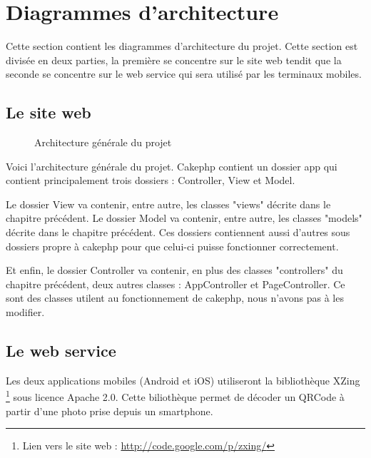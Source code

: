 \chapter{Diagrammes d'architecture}

Cette section contient les diagrammes d'architecture du projet. Cette section est divisée en deux parties, la première se concentre sur le site web tendit que la seconde se concentre sur le web service qui sera utilisé par les terminaux mobiles.
 
\newpage
\section{Le site web}

\begin{figure}[H]
	\begin{center}\end{center}
	\caption{Architecture générale du projet}
\end{figure}

Voici l'architecture générale du projet. Cakephp contient un dossier app qui contient principalement trois dossiers : Controller, View et Model. 

Le dossier View va contenir, entre autre, les classes "views" décrite dans le chapitre précédent. Le dossier Model va contenir, entre autre, les classes "models" décrite dans le chapitre précédent. Ces dossiers contiennent aussi d'autres sous dossiers propre à cakephp pour que celui-ci puisse fonctionner correctement.


Et enfin, le dossier Controller va contenir, en plus des classes "controllers" du chapitre précédent, deux autres classes : AppController et PageController. Ce sont des classes utilent au fonctionnement de cakephp, nous n'avons pas à les modifier.

\section{Le web service}
Les deux applications mobiles (Android et iOS) utiliseront la bibliothèque XZing \footnote{Lien vers le site web : \href{http://code.google.com/p/zxing/}{http://code.google.com/p/zxing/}} sous licence Apache 2.0.
Cette biliothèque permet de décoder un QRCode à partir d'une photo prise depuis un smartphone.

